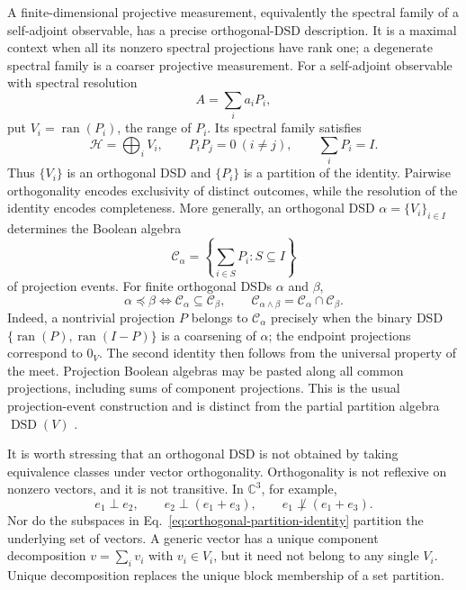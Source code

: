 \documentclass[aps,pra,reprint,nofootinbib]{revtex4-2}
\newcommand{\DSD}{\operatorname{DSD}}
\newcommand{\ran}{\operatorname{ran}}
\begin{document}
A finite-dimensional projective measurement, equivalently the spectral family
of a self-adjoint observable, has a precise orthogonal-DSD description.  It is
a maximal context when all its nonzero spectral projections have rank one; a
degenerate spectral family is a coarser projective measurement.  For a
self-adjoint observable with spectral resolution
\begin{equation}
  A=\sum_i a_iP_i,
  \label{eq:spectral-resolution}
\end{equation}
put $V_i=\ran(P_i)$, the range of $P_i$.  Its spectral family satisfies
\begin{equation}
  \mathcal H=\bigoplus_i V_i,
  \qquad
  P_iP_j=0\ (i\ne j),
  \qquad
  \sum_iP_i=I.
  \label{eq:orthogonal-partition-identity}
\end{equation}
Thus $\{V_i\}$ is an orthogonal DSD and $\{P_i\}$ is a partition of the
identity.  Pairwise orthogonality encodes exclusivity of distinct outcomes,
while the resolution of the identity encodes completeness.  More generally,
an orthogonal DSD $\alpha=\{V_i\}_{i\in I}$ determines the Boolean algebra
\begin{equation}
  \mathcal C_\alpha=
  \left\{\sum_{i\in S}P_i:S\subseteq I\right\}
  \label{eq:projection-context}
\end{equation}
of projection events.  For finite orthogonal DSDs $\alpha$ and $\beta$,
\begin{equation}
  \alpha\preceq\beta
  \Longleftrightarrow
  \mathcal C_\alpha\subseteq\mathcal C_\beta,
  \qquad
  \mathcal C_{\alpha\wedge\beta}
  =\mathcal C_\alpha\cap\mathcal C_\beta.
  \label{eq:orthogonal-ore-correspondence}
\end{equation}
Indeed, a nontrivial projection $P$ belongs to $\mathcal C_\alpha$ precisely
when the binary DSD $\{\ran(P),\ran(I-P)\}$ is a coarsening of $\alpha$; the
endpoint projections correspond to $0_V$.  The second identity then follows
from the universal property of the meet.  Projection Boolean algebras may be
pasted along all common projections, including sums of component projections.
This is the usual projection-event construction and
is distinct from the partial partition algebra $\DSD(V)$
\cite{ellerman-2018-dsd-quantum-logic,svozil-2018-b}.

It is worth stressing that an orthogonal DSD is not obtained by taking
equivalence classes under vector orthogonality.  Orthogonality is not reflexive
on nonzero vectors, and it is not transitive.  In $\mathbb C^3$, for example,
\begin{equation}
  e_1\perp e_2,\qquad
  e_2\perp(e_1+e_3),\qquad
  e_1\not\perp(e_1+e_3).
  \label{eq:orthogonality-not-equivalence}
\end{equation}
Nor do the subspaces in Eq.~\eqref{eq:orthogonal-partition-identity} partition
the underlying set of vectors.  A generic vector has a unique component
decomposition $v=\sum_i v_i$ with $v_i\in V_i$, but it need not belong to any
single $V_i$.  Unique decomposition replaces the unique block membership of
a set partition.
\end{document}
